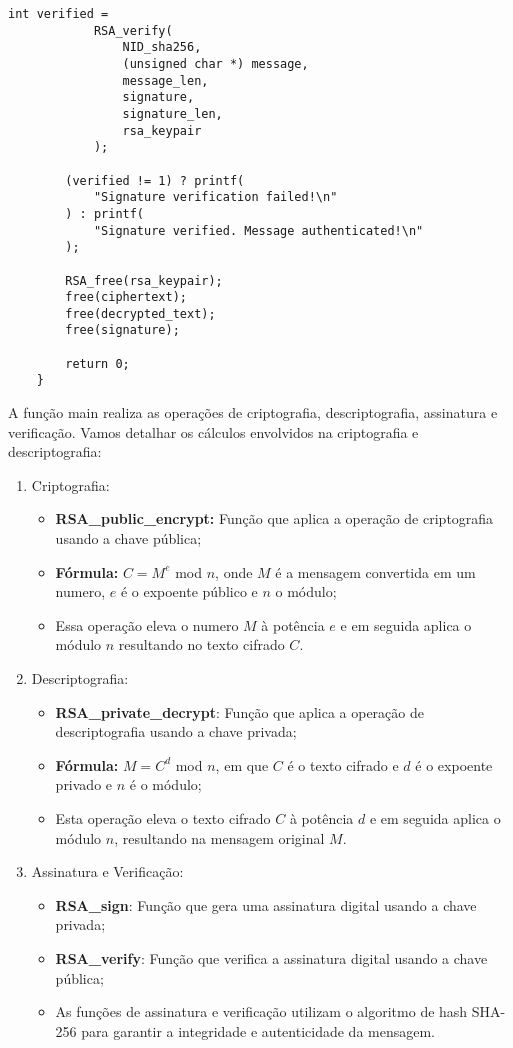 \documentclass[a4paper,12pt]{article}
\begin{document}
\begin{lstlisting}[style=CStyle]
        int verified =
            RSA_verify(
                NID_sha256,
                (unsigned char *) message,
                message_len,
                signature,
                signature_len,
                rsa_keypair
            );
    
        (verified != 1) ? printf(
            "Signature verification failed!\n"
        ) : printf(
            "Signature verified. Message authenticated!\n"
        );
    
        RSA_free(rsa_keypair);
        free(ciphertext);
        free(decrypted_text);
        free(signature);
    
        return 0;
    }
\end{lstlisting}

A função main realiza as operações de criptografia, descriptografia, assinatura e verificação. Vamos detalhar os cálculos envolvidos na criptografia e descriptografia:

\begin{enumerate}
    \item Criptografia:
        \begin{itemize}
            \item \textbf{RSA\_public\_encrypt:} Função que aplica a operação de criptografia usando a chave pública;
            \item \textbf{Fórmula:} \(C = M^{e}\) mod \(n\), onde \(M\) é a mensagem convertida em um numero, \(e\) é o expoente público e \(n\) o módulo;
            \item Essa operação eleva o numero \(M\) à potência \(e\) e em seguida aplica o módulo \(n\) resultando no texto cifrado \(C\).
        \end{itemize}
    \item Descriptografia:
        \begin{itemize}
            \item \textbf{RSA\_private\_decrypt}: Função que aplica a operação de descriptografia usando a chave privada;
            \item \textbf{Fórmula:} \(M = C^{d}\) mod \(n\), em que \(C\) é o texto cifrado e \(d\) é o expoente privado e \(n\) é o módulo;
            \item Esta operação eleva o texto cifrado \(C\) à potência \(d\) e em seguida aplica o módulo \(n\), resultando na mensagem original \(M\).
        \end{itemize}
    \item Assinatura e Verificação:
        \begin{itemize}
            \item \textbf{RSA\_sign}: Função que gera uma assinatura digital usando a chave privada;
            \item \textbf{RSA\_verify}: Função que verifica a assinatura digital usando a chave pública;
            \item As funções de assinatura e verificação utilizam o algoritmo de hash SHA-256 para garantir a integridade e autenticidade da mensagem.
        \end{itemize}
\end{enumerate}
\end{document}
